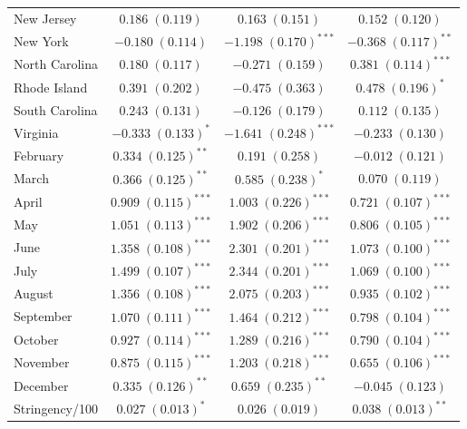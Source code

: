 \documentclass[10pt,letterpaper]{article}
\begin{document}
\begin{table}
\begin{center}
\begin{tabular}{l c c c}
New Jersey           & $0.186 \; (0.119)$        & $0.163 \; (0.151)$        & $0.152 \; (0.120)$        \\
New York             & $-0.180 \; (0.114)$       & $-1.198 \; (0.170)^{***}$ & $-0.368 \; (0.117)^{**}$  \\
North Carolina       & $0.180 \; (0.117)$        & $-0.271 \; (0.159)$       & $0.381 \; (0.114)^{***}$  \\
Rhode Island         & $0.391 \; (0.202)$        & $-0.475 \; (0.363)$       & $0.478 \; (0.196)^{*}$    \\
South Carolina       & $0.243 \; (0.131)$        & $-0.126 \; (0.179)$       & $0.112 \; (0.135)$        \\
Virginia             & $-0.333 \; (0.133)^{*}$   & $-1.641 \; (0.248)^{***}$ & $-0.233 \; (0.130)$       \\
February             & $0.334 \; (0.125)^{**}$   & $0.191 \; (0.258)$        & $-0.012 \; (0.121)$       \\
March                & $0.366 \; (0.125)^{**}$   & $0.585 \; (0.238)^{*}$    & $0.070 \; (0.119)$        \\
April                & $0.909 \; (0.115)^{***}$  & $1.003 \; (0.226)^{***}$  & $0.721 \; (0.107)^{***}$  \\
May                  & $1.051 \; (0.113)^{***}$  & $1.902 \; (0.206)^{***}$  & $0.806 \; (0.105)^{***}$  \\
June                 & $1.358 \; (0.108)^{***}$  & $2.301 \; (0.201)^{***}$  & $1.073 \; (0.100)^{***}$  \\
July                 & $1.499 \; (0.107)^{***}$  & $2.344 \; (0.201)^{***}$  & $1.069 \; (0.100)^{***}$  \\
August               & $1.356 \; (0.108)^{***}$  & $2.075 \; (0.203)^{***}$  & $0.935 \; (0.102)^{***}$  \\
September            & $1.070 \; (0.111)^{***}$  & $1.464 \; (0.212)^{***}$  & $0.798 \; (0.104)^{***}$  \\
October              & $0.927 \; (0.114)^{***}$  & $1.289 \; (0.216)^{***}$  & $0.790 \; (0.104)^{***}$  \\
November             & $0.875 \; (0.115)^{***}$  & $1.203 \; (0.218)^{***}$  & $0.655 \; (0.106)^{***}$  \\
December             & $0.335 \; (0.126)^{**}$   & $0.659 \; (0.235)^{**}$   & $-0.045 \; (0.123)$       \\
Stringency/100       & $0.027 \; (0.013)^{*}$    & $0.026 \; (0.019)$        & $0.038 \; (0.013)^{**}$   \\

\end{tabular}
\end{center}
\end{table}
\end{document}
